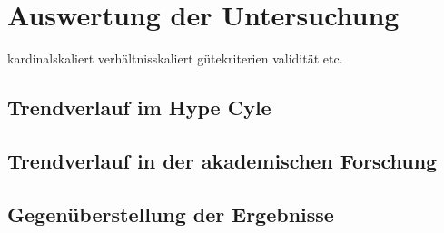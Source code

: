 \section{Auswertung der Untersuchung}

kardinalskaliert
verhältnisskaliert
gütekriterien validität etc.
\subsection{Trendverlauf im Hype Cyle}
\subsection{Trendverlauf in der akademischen Forschung}
\subsection{Gegenüberstellung der Ergebnisse}